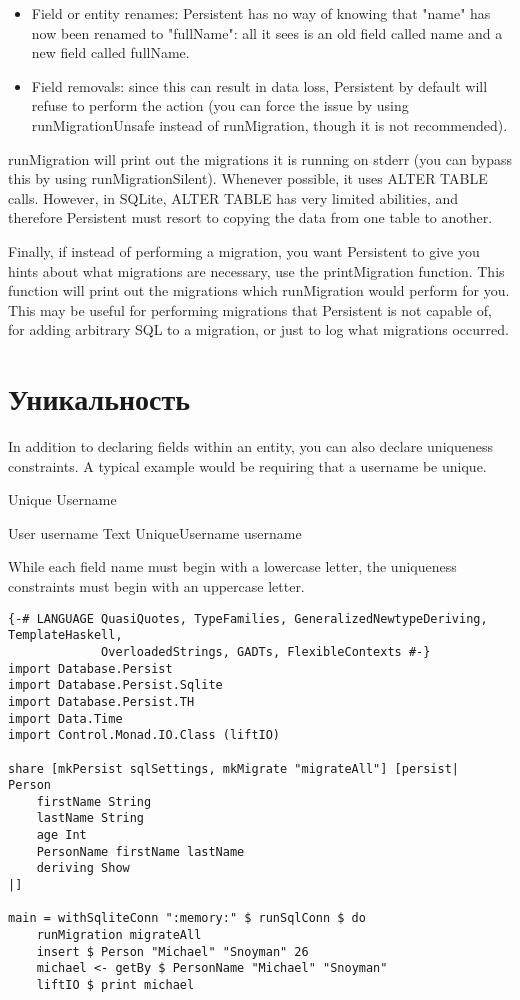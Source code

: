 \begin{itemize}
	\item Field or entity renames: Persistent has no way of knowing that "name" has now been renamed to "fullName": all it sees is an old field called name and a new field called fullName.
	\item Field removals: since this can result in data loss, Persistent by default will refuse to perform the action (you can force the issue by using runMigrationUnsafe instead of runMigration, though it is not recommended).
\end{itemize}

runMigration will print out the migrations it is running on stderr (you can bypass this by using runMigrationSilent). Whenever possible, it uses ALTER TABLE calls. However, in SQLite, ALTER TABLE has very limited abilities, and therefore Persistent must resort to copying the data from one table to another.

Finally, if instead of performing a migration, you want Persistent to give you hints about what migrations are necessary, use the printMigration function. This function will print out the migrations which runMigration would perform for you. This may be useful for performing migrations that Persistent is not capable of, for adding arbitrary SQL to a migration, or just to log what migrations occurred.

\section{Уникальность} %

In addition to declaring fields within an entity, you can also declare uniqueness constraints. A typical example would be requiring that a username be unique.


Unique Username

User
    username Text
    UniqueUsername username

While each field name must begin with a lowercase letter, the uniqueness constraints must begin with an uppercase letter.

\begin{lstlisting}
{-# LANGUAGE QuasiQuotes, TypeFamilies, GeneralizedNewtypeDeriving, TemplateHaskell,
             OverloadedStrings, GADTs, FlexibleContexts #-}
import Database.Persist
import Database.Persist.Sqlite
import Database.Persist.TH
import Data.Time
import Control.Monad.IO.Class (liftIO)

share [mkPersist sqlSettings, mkMigrate "migrateAll"] [persist|
Person
    firstName String
    lastName String
    age Int
    PersonName firstName lastName
    deriving Show
|]

main = withSqliteConn ":memory:" $ runSqlConn $ do
    runMigration migrateAll
    insert $ Person "Michael" "Snoyman" 26
    michael <- getBy $ PersonName "Michael" "Snoyman"
    liftIO $ print michael
\end{lstlisting}

